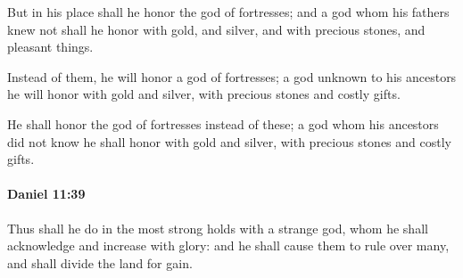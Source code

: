 			\begin{versebox}
					\item[BHS] 
					\item[LXX] 
					\item[ASV] But in his place shall he honor the god of fortresses; and a god whom his fathers knew not shall he honor with gold, and silver, and with precious stones, and pleasant things.
					\item[NIV] Instead of them, he will honor a god of fortresses; a god unknown to his ancestors he will honor with gold and silver, with precious stones and costly gifts.
					\item[NRSV] He shall honor the god of fortresses instead of these; a god whom his ancestors did not know he shall honor with gold and silver, with precious stones and costly gifts.
			\end{versebox}

		\paragraph{Daniel 11:39} %
			\label{DANIEL-11-39}

			Thus shall he do in the most strong holds with a strange god, whom he shall acknowledge and increase with glory: and he shall cause them to rule over many, and shall divide the land for gain.

